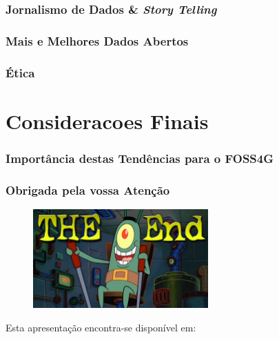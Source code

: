 \documentclass[hyperref={pdfpagelabels=true}]{beamer}
\begin{document}
\begin{frame}
\frametitle{Jornalismo de Dados \& \textit{Story Telling}}


\end{frame}

\begin{frame}
\frametitle{Mais e Melhores Dados Abertos}


\end{frame}

\begin{frame}
\frametitle{\'{E}tica}


\end{frame}

\section{Consideracoes Finais} 

\begin{frame}
\frametitle{Import\^{a}ncia destas Tend\^{e}ncias para o FOSS4G}





\end{frame}




\begin{frame}
\frametitle{Obrigada pela vossa Aten\c{c}\~{a}o}
    \begin{figure}   
      \includegraphics[width=0.6\textwidth]{end.jpg}      
    \end{figure}   
    Esta apresenta\c{c}\~{a}o encontra-se dispon\'{i}vel em: 
      \vspace{5mm}    
\end{frame}
\end{document}
